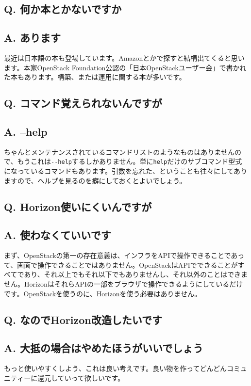 \documentclass[9pt,b5paper,tombo,openany]{jsbook}
\begin{document}
\subsection*{{\LARGE\bfseries Q.} 何か本とかないですか}
\subsection*{{\LARGE\bfseries A.} あります}
最近は日本語の本も登場しています。Amazonとかで探すと結構出てくると思います。本家OpenStack Foundation公認の「日本OpenStackユーザー会」で書かれた本もあります。構築、または運用に関する本が多いです。

\subsection*{{\LARGE\bfseries Q.} コマンド覚えられないんですが}
\subsection*{{\LARGE\bfseries A.} --help}
ちゃんとメンテナンスされているコマンドリストのようなものはありませんので、もうこれは\verb|--help|するしかありません。単に\verb|help|だけのサブコマンド型式になっているコマンドもあります。引数を忘れた、ということも往々にしてありますので、ヘルプを見るのを癖にしておくとよいでしょう。

\subsection*{{\LARGE\bfseries Q.} Horizon使いにくいんですが}
\subsection*{{\LARGE\bfseries A.} 使わなくていいです}
まず、OpenStackの第一の存在意義は、インフラをAPIで操作できることであって、画面で操作できることではありません。OpenStackはAPIでできることがすべてであり、それ以上でもそれ以下でもありませんし、それ以外のことはできません。HorizonはそれらAPIの一部をブラウザで操作できるようにしているだけです。OpenStackを使うのに、Horizonを使う必要はありません。

\subsection*{{\LARGE\bfseries Q.} なのでHorizon改造したいです}
\subsection*{{\LARGE\bfseries A.} 大抵の場合はやめたほうがいいでしょう}
もっと使いやすくしよう、これは良い考えです。良い物を作ってどんどんコミュニティーに還元していって欲しいです。
\end{document}
